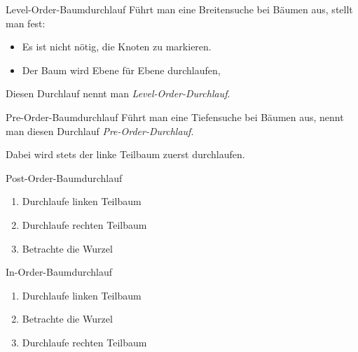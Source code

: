 \begin{defi}{Level-Order-Baumdurchlauf}
    Führt man eine Breitensuche bei Bäumen aus, stellt man fest:
    \begin{itemize}
        \item Es ist nicht nötig, die Knoten zu markieren.
        \item Der Baum wird Ebene für Ebene durchlaufen,
    \end{itemize}

    Diesen Durchlauf nennt man \emph{Level-Order-Durchlauf}.
\end{defi}

\begin{defi}{Pre-Order-Baumdurchlauf}
    Führt man eine Tiefensuche bei Bäumen aus, nennt man diesen Durchlauf \emph{Pre-Order-Durchlauf}.

    Dabei wird stets der linke Teilbaum zuerst durchlaufen.
\end{defi}

\begin{defi}{Post-Order-Baumdurchlauf}
    \begin{enumerate}
        \item Durchlaufe linken Teilbaum
        \item Durchlaufe rechten Teilbaum
        \item Betrachte die Wurzel
    \end{enumerate}
\end{defi}

\begin{defi}{In-Order-Baumdurchlauf}
    \begin{enumerate}
        \item Durchlaufe linken Teilbaum
        \item Betrachte die Wurzel
        \item Durchlaufe rechten Teilbaum
    \end{enumerate}
\end{defi}

